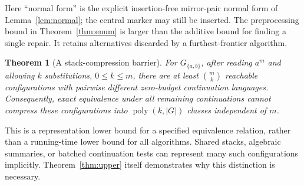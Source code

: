 \documentclass[sigconf,screen]{acmart}
\newtheorem{theorem}{Theorem}
\theoremstyle{definition}
\begin{document}
Here ``normal form'' is the explicit insertion-free mirror-pair normal form of Lemma~\ref{lem:normal}; the central marker may still be inserted. The preprocessing bound in Theorem~\ref{thm:enum} is larger than the additive bound for finding a single repair. It retains alternatives discarded by a furthest-frontier algorithm.

\begin{theorem}[A stack-compression barrier]\label{thm:barrier}
For $G_{\{a,b\}}$, after reading $a^m$ and allowing $k$ substitutions, $0\le k\le m$, there are at least $\binom{m}{k}$ reachable configurations with pairwise different zero-budget continuation languages. Consequently, exact equivalence under all remaining continuations cannot compress these configurations into $\operatorname{poly}(k,|G|)$ classes independent of $m$.
\end{theorem}

This is a representation lower bound for a specified equivalence relation, rather than a running-time lower bound for all algorithms. Shared stacks, algebraic summaries, or batched continuation tests can represent many such configurations implicitly. Theorem~\ref{thm:upper} itself demonstrates why this distinction is necessary.
\end{document}

